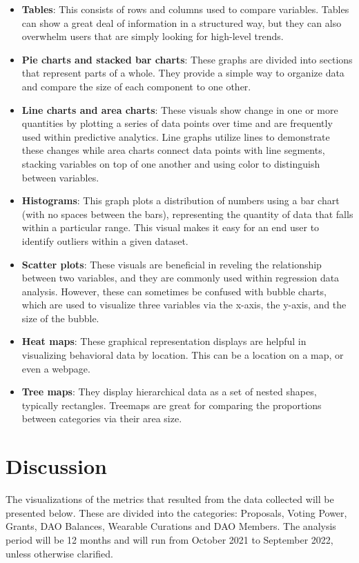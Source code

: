 \documentclass[MSE,Master,english]{twbook}%
\begin{document}
\begin{itemize}
  \item \textbf{Tables}: This consists of rows and columns used to compare variables. Tables can show a great deal of information in a structured way, but they can also overwhelm users that are simply looking for high-level trends.
  \item \textbf{Pie charts and stacked bar charts}: These graphs are divided into sections that represent parts of a whole. They provide a simple way to organize data and compare the size of each component to one other.
  \item \textbf{Line charts and area charts}: These visuals show change in one or more quantities by plotting a series of data points over time and are frequently used within predictive analytics. Line graphs utilize lines to demonstrate these changes while area charts connect data points with line segments, stacking variables on top of one another and using color to distinguish between variables.
  \item \textbf{Histograms}: This graph plots a distribution of numbers using a bar chart (with no spaces between the bars), representing the quantity of data that falls within a particular range. This visual makes it easy for an end user to identify outliers within a given dataset.
  \item \textbf{Scatter plots}: These visuals are beneficial in reveling the relationship between two variables, and they are commonly used within regression data analysis. However, these can sometimes be confused with bubble charts, which are used to visualize three variables via the x-axis, the y-axis, and the size of the bubble.
  \item \textbf{Heat maps}: These graphical representation displays are helpful in visualizing behavioral data by location. This can be a location on a map, or even a webpage.
  \item \textbf{Tree maps}: They display hierarchical data as a set of nested shapes, typically rectangles. Treemaps are great for comparing the proportions between categories via their area size.
\end{itemize}

\chapter{Discussion\label{discussion}}
The visualizations of the metrics that resulted from the data collected will be presented below. These are divided into the categories: Proposals, Voting Power, Grants, DAO Balances, Wearable Curations and DAO Members. The analysis period will be 12 months and will run from October 2021 to September 2022, unless otherwise clarified.
\end{document}
